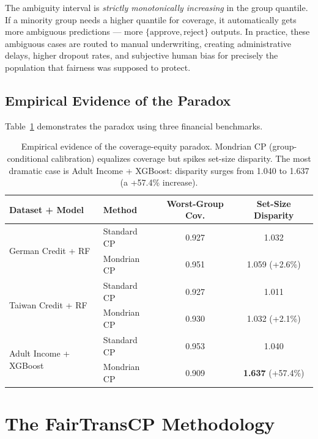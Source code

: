 \documentclass[11pt,a4paper]{article}
\begin{document}
\begin{keyinsight}
The ambiguity interval is \emph{strictly monotonically increasing} in the group quantile. If a minority group needs a higher quantile for coverage, it automatically gets more ambiguous predictions --- more $\{\text{approve}, \text{reject}\}$ outputs. In practice, these ambiguous cases are routed to manual underwriting, creating administrative delays, higher dropout rates, and subjective human bias for precisely the population that fairness was supposed to protect.
\end{keyinsight}

\subsection{Empirical Evidence of the Paradox}

Table~\ref{tab:paradox_evidence} demonstrates the paradox using three financial benchmarks.

\begin{table}[htbp]
\centering
\small
\caption{Empirical evidence of the coverage-equity paradox. Mondrian CP (group-conditional calibration) equalizes coverage but spikes set-size disparity. The most dramatic case is Adult Income + XGBoost: disparity surges from 1.040 to 1.637 (a +57.4\% increase).}
\label{tab:paradox_evidence}
\begin{tabular}{@{}llcc@{}}
\toprule
\textbf{Dataset + Model} & \textbf{Method} & \textbf{Worst-Group Cov.} & \textbf{Set-Size Disparity} \\
\midrule
\multirow{2}{*}{German Credit + RF}
    & Standard CP   & 0.927 & 1.032 \\
    & Mondrian CP   & 0.951 & 1.059 \textcolor{alertred}{(+2.6\%)} \\
\midrule
\multirow{2}{*}{Taiwan Credit + RF}
    & Standard CP   & 0.927 & 1.011 \\
    & Mondrian CP   & 0.930 & 1.032 \textcolor{alertred}{(+2.1\%)} \\
\midrule
\multirow{2}{*}{Adult Income + XGBoost}
    & Standard CP   & 0.953 & 1.040 \\
    & Mondrian CP   & 0.909 & \textbf{1.637} \textcolor{alertred}{(+57.4\%)} \\
\bottomrule
\end{tabular}
\end{table}

\section{The FairTransCP Methodology}
\label{sec:method}
\end{document}
